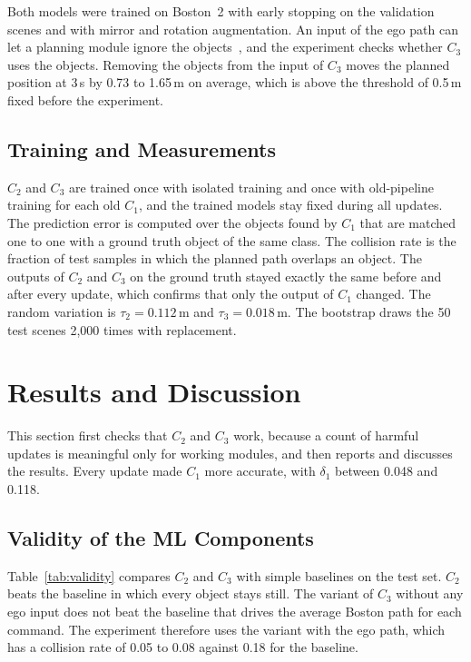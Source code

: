 \documentclass[conference]{IEEEtran}
\begin{document}
Both models were trained on Boston~2 with early stopping on the validation
scenes and with mirror and rotation augmentation. An input of the ego path can
let a planning module ignore the objects~\cite{li2024egostatus}, and the
experiment checks whether $C_3$ uses the objects. Removing the objects from the input of $C_3$ moves the planned
position at 3\,s by 0.73 to 1.65\,m on average, which is above the threshold of
0.5\,m fixed before the experiment.

\subsection{Training and Measurements}
\label{sec:measures}
$C_2$ and $C_3$ are trained once with isolated training and once with old-pipeline training for each old $C_1$, and the trained models stay fixed during all updates. The prediction error is computed over the objects found by $C_1$ that are matched one to one with a ground truth object of the same class. The collision rate is the fraction of test
samples in which the planned path overlaps an object. The outputs of $C_2$ and
$C_3$ on the ground truth stayed exactly the same before and after every
update, which confirms that only the output of $C_1$ changed. The random
variation is $\tau_2 = 0.112$\,m and $\tau_3 = 0.018$\,m. The bootstrap draws
the 50 test scenes 2{,}000 times with replacement.

\section{Results and Discussion}

This section first checks that $C_2$ and $C_3$ work, because a count of harmful updates is meaningful only for working modules, and then reports and discusses the results. Every update made $C_1$ more accurate,
with $\delta_1$ between 0.048 and 0.118.

\subsection{Validity of the ML Components}
Table~\ref{tab:validity} compares $C_2$ and $C_3$ with simple baselines on the
test set. $C_2$ beats the baseline in which every object stays still. The variant of $C_3$ without any ego input does not beat the
baseline that drives the average Boston path for each command. The experiment
therefore uses the variant with the ego path, which has a collision rate of
0.05 to 0.08 against 0.18 for the baseline.
\end{document}
